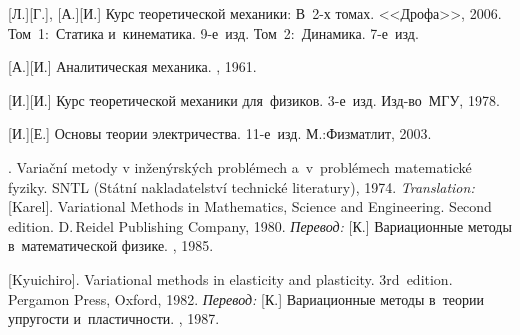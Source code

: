 \begin{thebibliography}{123}
\begin{otherlanguage}{russian}
[Л.][Г.], [А.][И.] Курс теоретической механики: В~2\hbox{-}х томах. <<Дрофа>>, 2006.
Том~1:~Статика и~кинематика. 9\hbox{-}е~изд. 
Том~2:~Динамика. 7\hbox{-}е~изд. 

[А.][И.] Аналитическая механика. \fizmatgiz, 1961. 

[И.][И.] Курс теоретической механики для~физиков. 3\hbox{-}е~изд. Изд\hbox{-}во~МГУ, 1978. 

[И.][Е.] %
Основы теории электричества. 11\hbox{-}е~изд. М.:\;Физматлит, 2003.

%
%



. Varia\v{c}ní metody v in\v{z}en\'{y}rsk\'{y}ch probl\'{e}mech a~v~pro\-bl\'{e}\-mech matematick\'{e} fyziky. SNTL (St\'{a}tní nakladatelství technick\'{e} literatury), 1974. 
\emph{Translation:}
[Karel]. Variational Methods in Mathematics, Science and Engineering. Second edition. D.\,Reidel Publishing Company, 1980. 
\emph{Перевод:}
[К.] Вариационные методы в~математической физике. \mirpublisher, 1985. 

[Kyuichiro]. Variational methods in elasticity and plasticity. 3rd~edition. Pergamon Press, Oxford, 1982. 
\emph{Перевод:} [К.] Вариационные методы в~теории упругости и~пластичности. \mirpublisher, 1987. 


\end{otherlanguage}
\end{thebibliography}
